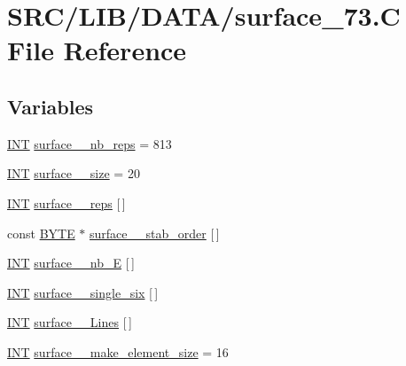 \hypertarget{surface__73_8_c}{}\section{S\+R\+C/\+L\+I\+B/\+D\+A\+T\+A/surface\+\_\+73.C File Reference}
\label{surface__73_8_c}
\subsection*{Variables}
\begin{DoxyCompactItemize}
\item 
\mbox{\hyperlink{galois_8h_a09fddde158a3a20bd2dcadb609de11dc}{I\+NT}} \mbox{\hyperlink{surface__73_8_c_a2598d4349a370160f0c076316ab64963}{surface\+\_\+\_\+nb\+\_\+reps}} = 813
\item 
\mbox{\hyperlink{galois_8h_a09fddde158a3a20bd2dcadb609de11dc}{I\+NT}} \mbox{\hyperlink{surface__73_8_c_aaa29bef17903e57fb1d623669730a6b6}{surface\+\_\+\_\+size}} = 20
\item 
\mbox{\hyperlink{galois_8h_a09fddde158a3a20bd2dcadb609de11dc}{I\+NT}} \mbox{\hyperlink{surface__73_8_c_a9df70aa479a92e7c6928bce77a373697}{surface\+\_\+\_\+reps}} \mbox{[}$\,$\mbox{]}
\item 
const \mbox{\hyperlink{galois_8h_ab6cc7b4aeb6ea31aba2b3fbfc83ff5e6}{B\+Y\+TE}} $\ast$ \mbox{\hyperlink{surface__73_8_c_a44a244af6cf5ff13b4992cab5fb116bc}{surface\+\_\+\_\+stab\+\_\+order}} \mbox{[}$\,$\mbox{]}
\item 
\mbox{\hyperlink{galois_8h_a09fddde158a3a20bd2dcadb609de11dc}{I\+NT}} \mbox{\hyperlink{surface__73_8_c_a6427bb56364dd68c9d33e82ee0f1e693}{surface\+\_\+\_\+nb\+\_\+E}} \mbox{[}$\,$\mbox{]}
\item 
\mbox{\hyperlink{galois_8h_a09fddde158a3a20bd2dcadb609de11dc}{I\+NT}} \mbox{\hyperlink{surface__73_8_c_adc5dd1f17b1a13a90eb2fdcb333e0dc3}{surface\+\_\+\_\+single\+\_\+six}} \mbox{[}$\,$\mbox{]}
\item 
\mbox{\hyperlink{galois_8h_a09fddde158a3a20bd2dcadb609de11dc}{I\+NT}} \mbox{\hyperlink{surface__73_8_c_a89ef172662740974da03149656916398}{surface\+\_\+\_\+\+Lines}} \mbox{[}$\,$\mbox{]}
\item 
\mbox{\hyperlink{galois_8h_a09fddde158a3a20bd2dcadb609de11dc}{I\+NT}} \mbox{\hyperlink{surface__73_8_c_a6b0e5e057bcbb70c5467ea242d319009}{surface\+\_\+\_\+make\+\_\+element\+\_\+size}} = 16
\item 

\end{DoxyCompactItemize}
